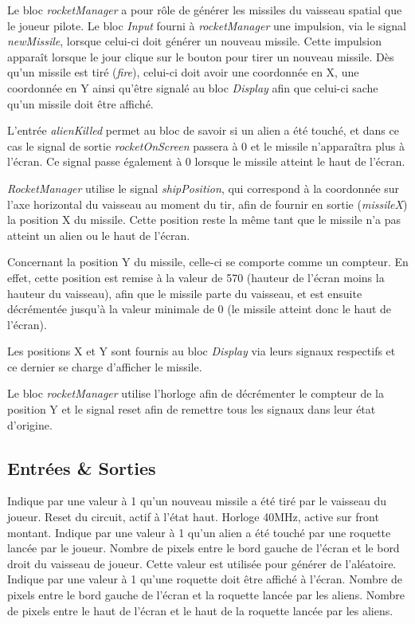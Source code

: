 \documentclass[french]{nakrule}
\begin{document}
Le bloc \emph{rocketManager} a pour rôle de générer les missiles du vaisseau
spatial que le joueur pilote. Le bloc \emph{Input} fourni à \emph{rocketManager}
une impulsion, via le signal \emph{newMissile}, lorsque celui-ci doit générer un
nouveau missile. Cette impulsion apparaît lorsque le jour clique sur le bouton
pour tirer un nouveau missile. Dès qu'un missile est tiré (\emph{fire}), celui-ci doit avoir
une coordonnée en X, une coordonnée en Y ainsi qu'être signalé au bloc
\emph{Display} afin que celui-ci sache qu'un missile doit être affiché.

L'entrée \emph{alienKilled} permet au bloc de savoir si un alien a été touché,
et dans ce cas le signal de sortie \emph{rocketOnScreen} passera à 0 et le
missile n'apparaîtra plus à l'écran. Ce signal passe
également à 0 lorsque le missile atteint le haut de l'écran.

\emph{RocketManager} utilise le signal \emph{shipPosition}, qui correspond à la
coordonnée sur l'axe horizontal du vaisseau au moment du tir, afin de fournir
en sortie (\emph{missileX}) la position X du missile. Cette position reste la
même tant que le missile n'a pas atteint un alien ou le haut de l'écran.

Concernant la position Y du missile, celle-ci se comporte comme un compteur. En
effet, cette position est remise à la valeur de 570 (hauteur de l'écran moins la
hauteur du vaisseau), afin que le missile parte du vaisseau, et est ensuite
décrémentée jusqu'à la valeur minimale de 0 (le missile atteint donc le haut de
l'écran).

Les positions X et Y sont fournis au bloc \emph{Display} via leurs signaux
respectifs et ce dernier se charge d'afficher le missile.

Le bloc \emph{rocketManager} utilise l’horloge afin de décrémenter le compteur de
la position Y et le signal reset afin de remettre tous les signaux dans leur
état d'origine.

\subsection{Entrées \& Sorties}
\label{subsec:Entrees_Sorties_rocketManager}

\begin{descr}
   Indique par une valeur à 1 qu'un nouveau missile a été
  tiré par le vaisseau du joueur.
   Reset du circuit, actif à l'état haut.
   Horloge 40MHz, active sur front montant.
   Indique par une valeur à 1 qu'un alien a été touché
  par une roquette lancée par le joueur.
   Nombre de pixels entre le bord gauche de l'écran et
  le bord droit du vaisseau de joueur. Cette valeur est utilisée pour générer de l'aléatoire.
   Indique par une valeur à 1 qu'une roquette doit être
  affiché à l'écran.
   Nombre de pixels entre le bord gauche de l'écran et la roquette
  lancée par les aliens.
   Nombre de pixels entre le haut de l'écran et le haut de la roquette
  lancée par les aliens.
\end{descr}
\clearpage
\end{document}
